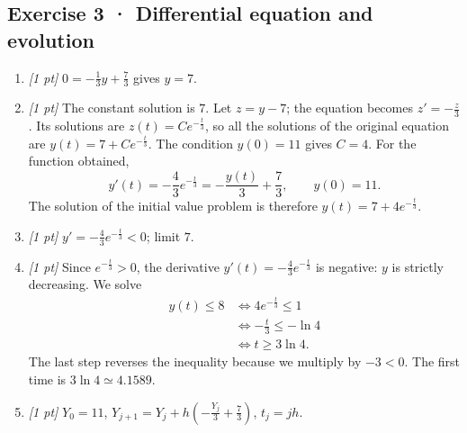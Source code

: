 \subsection*{Exercise 3 · Differential equation and evolution}\begin{enumerate}

\item \textit{[1 pt]} $0=-\frac{1}{3}y+\frac{7}{3}$ gives $y=7$.

\item \textit{[1 pt]} The constant solution is $7$. Let $z=y-7$; the equation becomes $z'=-\frac{z}{3}$. Its solutions are $z(t)=Ce^{-\frac{t}{3}}$, so all the solutions of the original equation are $y(t)=7+Ce^{-\frac{t}{3}}$.
The condition $y(0)=11$ gives $C=4$. For the function obtained,
\[y'(t)=-\frac{4}{3}e^{-\frac{t}{3}}=-\frac{y(t)}{3}+\frac{7}{3},\qquad y(0)=11.\]
The solution of the initial value problem is therefore $y(t)=7+4e^{-\frac{t}{3}}$.

\item \textit{[1 pt]} $y'=-\frac{4}{3}e^{-\frac{t}{3}}<0$; limit $7$.

\item \textit{[1 pt]} Since $e^{-\frac{t}{3}}>0$, the derivative $y'(t)=-\frac{4}{3}e^{-\frac{t}{3}}$ is negative: $y$ is strictly decreasing. We solve
\[\begin{aligned}y(t)\le 8&\Longleftrightarrow 4e^{-\frac{t}{3}}\le1\\&\Longleftrightarrow -\frac{t}{3}\le-\ln 4\\&\Longleftrightarrow t\ge 3\ln 4.\end{aligned}\]
The last step reverses the inequality because we multiply by $-3<0$. The first time is $3\ln 4\simeq\num{4,1589}$.

\item \textit{[1 pt]} $Y_0=11$, $Y_{j+1}=Y_j+h(-\frac{Y_j}{3}+\frac{7}{3})$, $t_j=jh$.

\end{enumerate}

